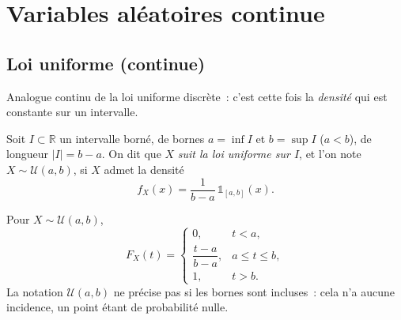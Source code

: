 \chapter{Variables aléatoires continue}
















\section{Loi uniforme (continue)}

Analogue continu de la loi uniforme discrète~: c'est cette fois la
\emph{densité} qui est constante sur un intervalle.

\medskip

\begin{mdframed}
\begin{definition}
Soit $I\subset\mathbb{R}$ un intervalle borné, de bornes $a=\inf I$ et $b=\sup I$
($a<b$), de longueur $|I|=b-a$. On dit que $X$ \emph{suit la loi uniforme sur
$I$}, et l'on note $X\sim\mathcal{U}(a,b)$, si $X$ admet la densité
\[
  f_X(x)=\frac{1}{b-a}\,\mathbb{1}_{[a,b]}(x).
\]
\end{definition}
\end{mdframed}

\medskip

\begin{mdframed}
\begin{proposition}
Pour $X\sim\mathcal{U}(a,b)$,
\[
  F_X(t)=
  \begin{cases}
    0, & t<a,\\[2pt]
    \dfrac{t-a}{b-a}, & a\le t\le b,\\[6pt]
    1, & t>b.
  \end{cases}
\]
La notation $\mathcal{U}(a,b)$ ne précise pas si les bornes sont incluses~: cela n'a
aucune incidence, un point étant de probabilité nulle.
\end{proposition}
\end{mdframed}

\medskip

